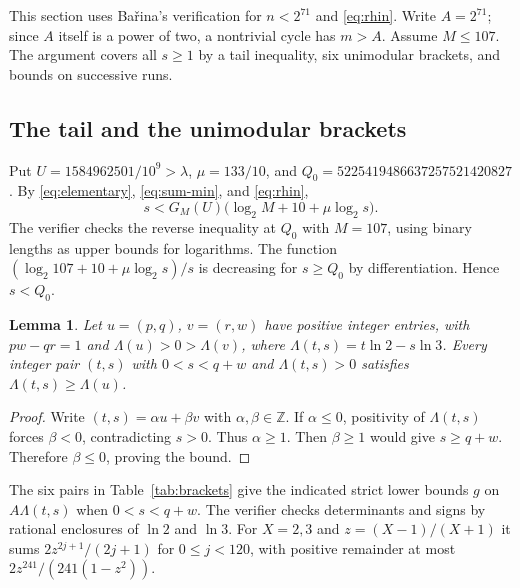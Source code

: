 \documentclass[11pt]{article}
\newtheorem{lemma}[theorem]{Lemma}
\theoremstyle{definition}
\newcommand{\Z}{\mathbb Z}
\begin{document}
This section uses Ba\v{r}ina's verification for \(n<2^{71}\)
\cite{Barina} and \eqref{eq:rhin}. Write \(A=2^{71}\);
since \(A\) itself is a power of two, a nontrivial cycle has \(m>A\).
Assume \(M\le107\). The argument covers all \(s\ge1\) by a tail
inequality, six unimodular brackets, and bounds on successive runs.

\subsection{The tail and the unimodular brackets}

Put \(U=1584962501/10^9>\lambda\), \(\mu=133/10\), and
\(Q_0=5225419486637257521420827\). By \eqref{eq:elementary}, \eqref{eq:sum-min},
and \eqref{eq:rhin},
\begin{equation}\label{eq:tail}
 s<G_M(U)\bigl(\log_2 M+10+\mu\log_2 s\bigr).
\end{equation}
The verifier checks the reverse inequality at \(Q_0\) with
\(M=107\), using binary lengths as upper bounds for logarithms.
The function \((\log_2 107+10+\mu\log_2 s)/s\) is decreasing for
\(s\ge Q_0\) by differentiation. Hence \(s<Q_0\).

\begin{lemma}\label{lem:bracket}
Let \(u=(p,q)\), \(v=(r,w)\) have positive integer entries, with
\(pw-qr=1\) and \(\Lambda(u)>0>\Lambda(v)\), where
\(\Lambda(t,s)=t\ln2-s\ln3\).
Every integer pair \((t,s)\) with \(0<s<q+w\) and \(\Lambda(t,s)>0\)
satisfies \(\Lambda(t,s)\ge\Lambda(u)\).
\end{lemma}

\begin{proof}
Write \((t,s)=\alpha u+\beta v\) with \(\alpha,\beta\in\Z\).
If \(\alpha\le0\), positivity of \(\Lambda(t,s)\) forces
\(\beta<0\), contradicting \(s>0\). Thus \(\alpha\ge1\).
Then \(\beta\ge1\) would give \(s\ge q+w\).
Therefore \(\beta\le0\), proving the bound.
\end{proof}

The six pairs in Table~\ref{tab:brackets} give the indicated
strict lower bounds \(g\) on \(A\Lambda(t,s)\) when \(0<s<q+w\).
The verifier checks determinants and signs by rational enclosures
of \(\ln2\) and \(\ln3\). For \(X=2,3\) and \(z=(X-1)/(X+1)\)
it sums \(2z^{2j+1}/(2j+1)\) for \(0\le j<120\), with positive
remainder at most \(2z^{241}/(241(1-z^2))\).
\end{document}
